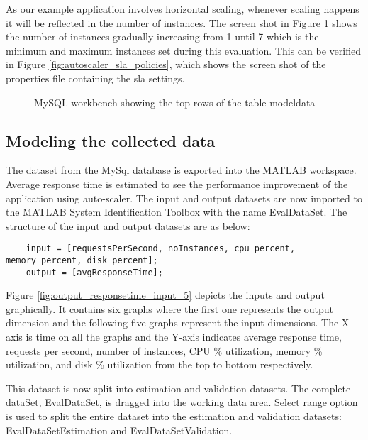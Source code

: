 \documentclass[article,type=msc,colorback,12pt,accentcolor=tud8b,table]{tudthesis}
\begin{document}
		As our example application involves horizontal scaling, whenever scaling happens it will be reflected in the number of instances. The screen shot in Figure \ref{fig:db_rows} shows the number of instances gradually increasing from 1 until 7 which is the minimum and maximum instances set during this evaluation. This can be verified in Figure \ref{fig:autoscaler_sla_policies}, which shows the screen shot of the properties file containing the \gls{sla} settings. 

	
		  	  \begin{figure}[H]
		  	  	\begin{center}
		  	  		\makebox[\textwidth]{\texttt{[image: E6]}}
		  	  	\end{center}
		  	  	\caption{MySQL workbench showing the top rows of the table modeldata}
		  	  	\label{fig:db_rows}
		  	  \end{figure}
		  	 	
	\subsection{Modeling the collected data}
	
	The dataset from the MySql database is exported into the MATLAB workspace. Average response time is estimated to see the performance improvement of the application using auto-scaler. The input and output datasets are now imported to the MATLAB System Identification Toolbox with the name EvalDataSet. The structure of the input and output datasets are as below:
	
	\begin{lstlisting} 
	input = [requestsPerSecond, noInstances, cpu_percent, memory_percent, disk_percent];
	output = [avgResponseTime];
	\end{lstlisting} 
	
	Figure \ref{fig:output_responsetime_input_5} depicts the inputs and output graphically. It contains six graphs where the first one represents the output dimension and the following five graphs represent the input dimensions. The X-axis is time on all the graphs and the Y-axis indicates average response time, requests per second, number of instances, CPU \% utilization, memory \% utilization, and disk \% utilization from the top to bottom respectively.
	
This dataset is now split into estimation and validation datasets. The complete dataSet, EvalDataSet, is dragged into the working data area. Select range option is used to split the entire dataset into the estimation and validation datasets: EvalDataSetEstimation and EvalDataSetValidation. 
\end{document}
